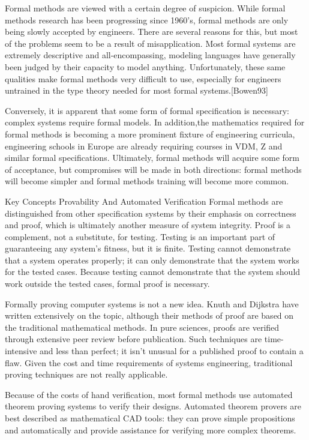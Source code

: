 Formal methods are viewed with a certain degree of suspicion. While formal methods research has been progressing since 1960's, formal methods are only being slowly accepted by engineers. There are several reasons for this, but most of the problems seem to be a result of misapplication. Most formal systems are extremely descriptive and all-encompassing, modeling languages have generally been judged by their capacity to model anything. Unfortunately, these same qualities make formal methods very difficult to use, especially for engineers untrained in the type theory needed for most formal systems.[Bowen93]

Conversely, it is apparent that some form of formal specification is necessary: complex systems require formal models. In addition,the mathematics required for formal methods is becoming a more prominent fixture of engineering curricula, engineering schools in Europe are already requiring courses in VDM, Z and similar formal specifications. Ultimately, formal methods will acquire some form of acceptance, but compromises will be made in both directions: formal methods will become simpler and formal methods training will become more common.

Key Concepts
Provability And Automated Verification
Formal methods are distinguished from other specification systems by their emphasis on correctness and proof, which is ultimately another measure of system integrity. Proof is a complement, not a substitute, for testing. Testing is an important part of guaranteeing any system's fitness, but it is finite. Testing cannot demonstrate that a system operates properly; it can only demonstrate that the system works for the tested cases. Because testing cannot demonstrate that the system should work outside the tested cases, formal proof is necessary.

Formally proving computer systems is not a new idea. Knuth and Dijkstra have written extensively on the topic, although their methods of proof are based on the traditional mathematical methods. In pure sciences, proofs are verified through extensive peer review before publication. Such techniques are time-intensive and less than perfect; it isn't unusual for a published proof to contain a flaw. Given the cost and time requirements of systems engineering, traditional proving techniques are not really applicable.

Because of the costs of hand verification, most formal methods use automated theorem proving systems to verify their designs. Automated theorem provers are best described as mathematical CAD tools: they can prove simple propositions and automatically and provide assistance for verifying more complex theorems.

